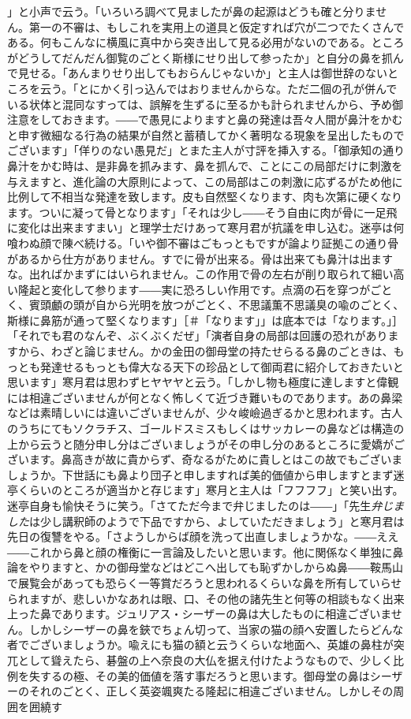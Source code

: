 \documentclass[12pt, openright]{book}
\begin{document}
」と小声で云う。「いろいろ調べて見ましたが鼻の起源はどうも確と分りません。第一の不審は、もしこれを実用上の道具と仮定すれば穴が二つでたくさんである。何もこんなに横風に真中から突き出して見る必用がないのである。ところがどうしてだんだん御覧のごとく斯様にせり出して参ったか」と自分の鼻を抓んで見せる。「あんまりせり出してもおらんじゃないか」と主人は御世辞のないところを云う。「とにかく引っ込んではおりませんからな。ただ二個の孔が併んでいる状体と混同なすっては、誤解を生ずるに至るかも計られませんから、予め御注意をしておきます。――で愚見によりますと鼻の発達は吾々人間が鼻汁をかむと申す微細なる行為の結果が自然と蓄積してかく著明なる現象を呈出したものでございます」「佯りのない愚見だ」とまた主人が寸評を挿入する。「御承知の通り鼻汁をかむ時は、是非鼻を抓みます、鼻を抓んで、ことにこの局部だけに刺激を与えますと、進化論の大原則によって、この局部はこの刺激に応ずるがため他に比例して不相当な発達を致します。皮も自然堅くなります、肉も次第に硬くなります。ついに凝って骨となります」「それは少し――そう自由に肉が骨に一足飛に変化は出来ますまい」と理学士だけあって寒月君が抗議を申し込む。迷亭は何喰わぬ顔で陳べ続ける。「いや御不審はごもっともですが論より証拠この通り骨があるから仕方がありません。すでに骨が出来る。骨は出来ても鼻汁は出ますな。出ればかまずにはいられません。この作用で骨の左右が削り取られて細い高い隆起と変化して参ります――実に恐ろしい作用です。点滴の石を穿つがごとく、賓頭顱の頭が自から光明を放つがごとく、不思議薫不思議臭の喩のごとく、斯様に鼻筋が通って堅くなります」{［＃「なります」」は底本では「なります。」］}「それでも君のなんぞ、ぶくぶくだぜ」「演者自身の局部は回護の恐れがありますから、わざと論じません。かの金田の御母堂の持たせらるる鼻のごときは、もっとも発達せるもっとも偉大なる天下の珍品として御両君に紹介しておきたいと思います」寒月君は思わずヒヤヤヤと云う。「しかし物も極度に達しますと偉観には相違ございませんが何となく怖しくて近づき難いものであります。あの鼻梁などは素晴しいには違いございませんが、少々峻嶮過ぎるかと思われます。古人のうちにてもソクラチス、ゴールドスミスもしくはサッカレーの鼻などは構造の上から云うと随分申し分はございましょうがその申し分のあるところに愛嬌がございます。鼻高きが故に貴からず、奇なるがために貴しとはこの故でもございましょうか。下世話にも鼻より団子と申しますれば美的価値から申しますとまず迷亭くらいのところが適当かと存じます」寒月と主人は「フフフフ」と笑い出す。迷亭自身も愉快そうに笑う。「さてただ今まで弁じましたのは――」「先生\emph{弁じました}は少し講釈師のようで下品ですから、よしていただきましょう」と寒月君は先日の復讐をやる。「さようしからば顔を洗って出直しましょうかな。――ええ――これから鼻と顔の権衡に一言論及したいと思います。他に関係なく単独に鼻論をやりますと、かの御母堂などはどこへ出しても恥ずかしからぬ鼻――鞍馬山で展覧会があっても恐らく一等賞だろうと思われるくらいな鼻を所有していらせられますが、悲しいかなあれは眼、口、その他の諸先生と何等の相談もなく出来上った鼻であります。ジュリアス・シーザーの鼻は大したものに相違ございません。しかしシーザーの鼻を鋏でちょん切って、当家の猫の顔へ安置したらどんな者でございましょうか。喩えにも猫の額と云うくらいな地面へ、英雄の鼻柱が突兀として聳えたら、碁盤の上へ奈良の大仏を据え付けたようなもので、少しく比例を失するの極、その美的価値を落す事だろうと思います。御母堂の鼻はシーザーのそれのごとく、正しく英姿颯爽たる隆起に相違ございません。しかしその周囲を囲繞す
\end{document}
